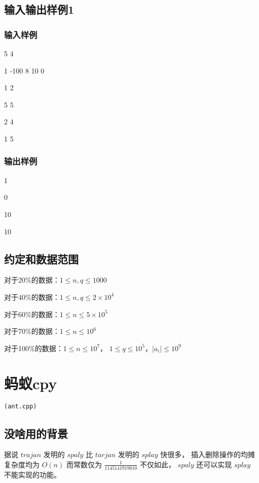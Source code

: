 \documentclass[UTF8]{ctexart}
\begin{document}
\subsection{输入输出样例1}

\subsubsection{输入样例}

5 4

1 -100 8 10 0

1 2

5 5

2 4

1 5

\subsubsection{输出样例}

1

0

10

10

\subsection{约定和数据范围}

对于20\%的数据：$1\le n,q \le 1000$

对于40\%的数据：$1\le n,q \le 2\times 10^4$

对于60\%的数据：$1\le n \le 5\times 10^5$

对于70\%的数据：$1\le n \le 10^6$

对于100\%的数据：$1 \le n \le 10^7$， $1\le q\le 10^5$，$|a_i| \le 10^9$

\newpage
\section{蚂蚁cpy}
\begin{center}
\tt\large{(ant.cpp)}
\end{center}

\subsection{没啥用的背景}

据说 $trajan$ 发明的 $spaly$ 比 $tarjan$ 发明的 $splay$ 快很多， 插入删除操作的均摊复杂度均为 $O(n)$ 而常数仅为 $\frac{1}{1145141919810}$ 不仅如此， $spaly$ 还可以实现 $splay$ 不能实现的功能。
\end{document}
